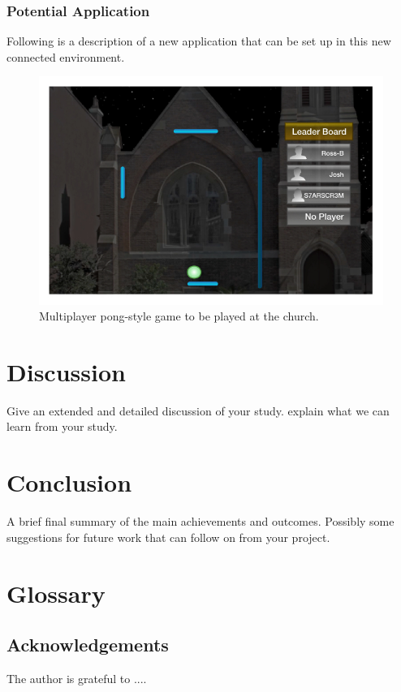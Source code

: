 \documentclass[a4paper,12pt]{article}
\begin{document}
\subsubsection{Potential Application}
Following is a description of a new application that can be set up in this new connected environment.


\begin{figure}[ht!]
	\centering
	\includegraphics[width=125mm]{./images/MultiPlayerChurchGame}
	\caption{Multiplayer pong-style game to be played at the church.}
	\label{application-multiPlyerPong}
\end{figure}
\newpage
\section{Discussion}
%
Give an extended and detailed discussion of your study. explain what we can learn from your study.
%

\section{Conclusion}
%
A brief final summary of the main achievements and outcomes. Possibly some suggestions for future work that can follow on from your project.%


\section{Glossary}
%
\subsection*{Acknowledgements}
The author is grateful to ....
%
\vskip 0.2in
\newpage


\end{document}
